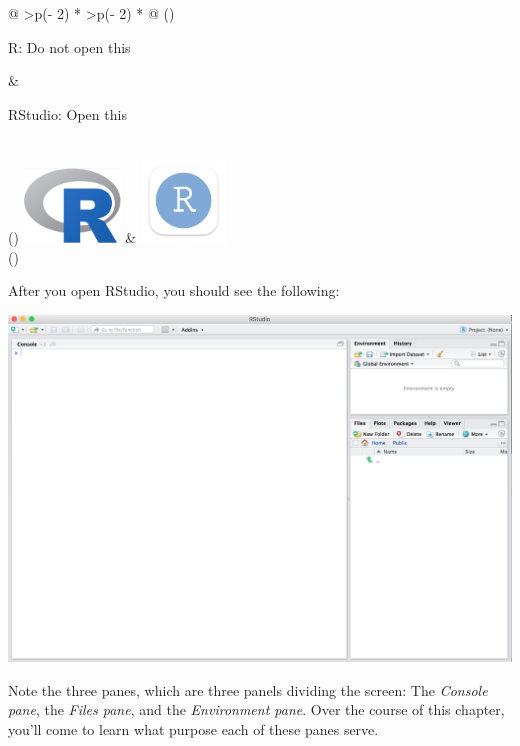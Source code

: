 \documentclass[
  letterpaper,
  DIV=11,
  numbers=noendperiod]{scrreprt}
\theoremstyle{definition}
\theoremstyle{remark}
\begin{document}
\begin{longtable}[]{@{}
  >{\centering\arraybackslash}p{(\columnwidth - 2\tabcolsep) * }
  >{\centering\arraybackslash}p{(\columnwidth - 2\tabcolsep) * }@{}}
\toprule()
\begin{minipage}[b]{\linewidth}\centering
R: Do not open this
\end{minipage} & \begin{minipage}[b]{\linewidth}\centering
RStudio: Open this
\end{minipage} \\
\midrule()
\endhead
\includegraphics[width=\textwidth,height=0.78125in]{images/logos/Rlogo.png}
&
\includegraphics[width=0.88542in,height=\textheight]{images/logos/rstudio-square-logo.png} \\
\bottomrule()
\end{longtable}

After you open RStudio, you should see the following:

\includegraphics{images/rstudio.png}

Note the three panes, which are three panels dividing the screen: The
\emph{Console pane}, the \emph{Files pane}, and the \emph{Environment
pane}. Over the course of this chapter, you'll come to learn what
purpose each of these panes serve.
\end{document}
